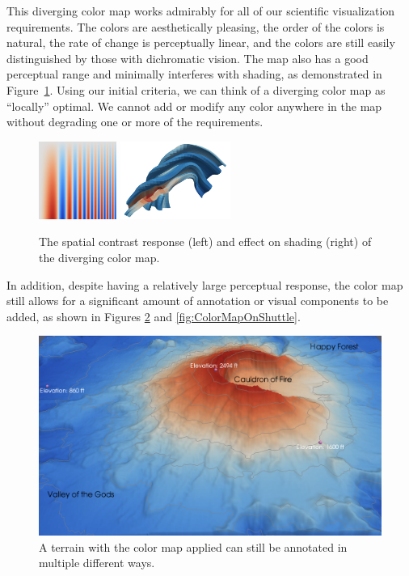 \documentclass{acmsiggraph}               %
\begin{document}
This diverging color map works admirably for all of our scientific
visualization requirements.  The colors are aesthetically pleasing, the
order of the colors is natural, the rate of change is perceptually linear,
and the colors are still easily distinguished by those with dichromatic
vision.  The map also has a good perceptual range and minimally interferes
with shading, as demonstrated in Figure~\ref{fig:Cool2WarmResponse}.
Using our initial criteria, we can think of a diverging color map as
``locally'' optimal.  We cannot add or modify any color anywhere in the map
without degrading one or more of the requirements.

\begin{figure}
  \centering
  \includegraphics[height=1in]{images/Cool2WarmSpatialContrast}
  \quad
  \includegraphics[height=1in]{images/Cool2WarmShading}
  \caption{The spatial contrast response (left) and effect on shading
    (right) of the diverging color map.}
  \label{fig:Cool2WarmResponse}
\end{figure}

In addition, despite having a relatively large perceptual response, the
color map still allows for a significant amount of annotation or visual
components to be added, as shown in Figures
\ref{fig:ColorMapWithAnnotation} and \ref{fig:ColorMapOnShuttle}.

\begin{figure}
  \centering
  \includegraphics[width=\linewidth]{images/AnnotationExample}
  \caption{A terrain with the color map applied can still be annotated in
    multiple different ways.}
  \label{fig:ColorMapWithAnnotation}
\end{figure}
\end{document}
